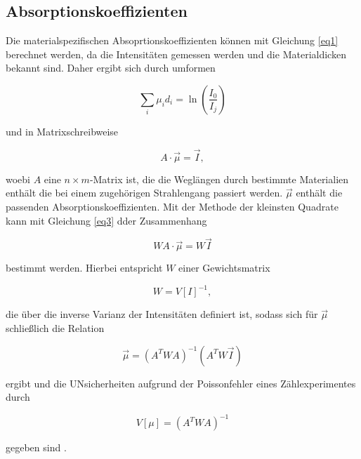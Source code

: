 \subsection{Absorptionskoeffizienten}
\label{sec:Absorp}

Die materialspezifischen Absoprtionskoeffizienten können mit Gleichung \eqref{eq1} 
berechnet werden, da die Intensitäten gemessen werden und die Materialdicken bekannt sind.
Daher ergibt sich durch umformen


\begin{equation}
	\sum_i \mu_i d_i  = \ln( \frac{I_0}{I_j} )
	\label{eq2}
\end{equation}

und in Matrixschreibweise


\begin{equation}
	A \cdot \vec{\mu} = \vec{I},
	\label{eq3}
\end{equation}

woebi $A$ eine $n \times m$-Matrix ist, die die Weglängen durch bestimmte Materialien 
enthält die bei einem zugehörigen Strahlengang passiert werden. $\vec{\mu}$ enthält die 
passenden Absorptionskoeffizienten. Mit der Methode der kleinsten Quadrate kann 
mit Gleichung \eqref{eq3} dder Zusammenhang 


\begin{equation}
	WA \cdot \vec{\mu} = W \vec{I}
	\label{eq4}
\end{equation}

bestimmt werden.
Hierbei entspricht $W$ einer Gewichtsmatrix


\begin{equation}
	W = V[I]^{-1},
	\label{eq5}
\end{equation}

die über die inverse Varianz der 
Intensitäten definiert ist, sodass sich für $\vec{\mu}$ schließlich die Relation 


\begin{equation}
	\vec{\mu} = (A^{T}WA)^{-1}(A^{T}W\vec{I})
	\label{eq6}
\end{equation}

ergibt und die UNsicherheiten aufgrund der Poissonfehler eines Zählexperimentes durch


\begin{equation}
	V[\mu]= (A^{T}WA)^{-1}
	\label{eq7}
\end{equation}

gegeben sind \cite{Kerne}.


























